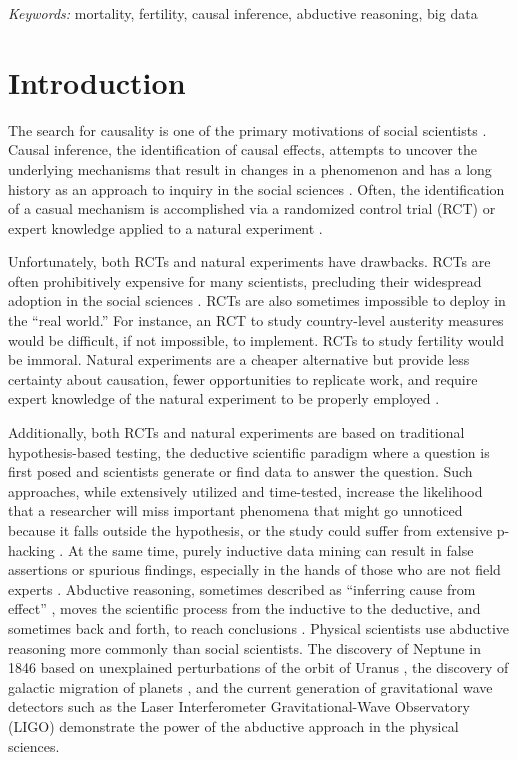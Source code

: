 \documentclass[12pt]{article}
\begin{document}
\noindent%
{\it Keywords:} mortality, fertility, causal inference, abductive
reasoning, big data
\vfill

\newpage
{} %

\newpage

\hypertarget{introduction}{%
\section{Introduction}\label{introduction}}

The search for causality is one of the primary motivations of social
scientists \citep{smith2011commentary, pearl2009causal}. Causal
inference, the identification of causal effects, attempts to uncover the
underlying mechanisms that result in changes in a phenomenon and has a
long history as an approach to inquiry in the social sciences
\citep{grimmer2015ppsp}. Often, the identification of a casual mechanism
is accomplished via a randomized control trial (RCT) or expert knowledge
applied to a natural experiment \citep{salganik2019bit}.

Unfortunately, both RCTs and natural experiments have drawbacks. RCTs
are often prohibitively expensive for many scientists, precluding their
widespread adoption in the social sciences \citep{west2008ajph}. RCTs
are also sometimes impossible to deploy in the ``real world.'' For
instance, an RCT to study country-level austerity measures would be
difficult, if not impossible, to implement. RCTs to study fertility
would be immoral. Natural experiments are a cheaper alternative but
provide less certainty about causation, fewer opportunities to replicate
work, and require expert knowledge of the natural experiment to be
properly employed \citep{pearl2018book}.

Additionally, both RCTs and natural experiments are based on traditional
hypothesis-based testing, the deductive scientific paradigm where a
question is first posed and scientists generate or find data to answer
the question. Such approaches, while extensively utilized and
time-tested, increase the likelihood that a researcher will miss
important phenomena that might go unnoticed because it falls outside the
hypothesis, or the study could suffer from extensive p-hacking
\citep{head2015extent, nuzzo2014scientific, ruggles2014big}. At the same
time, purely inductive data mining can result in false assertions or
spurious findings, especially in the hands of those who are not field
experts \citep{yanai_hypothesis_2020}. Abductive reasoning, sometimes
described as ``inferring cause from effect'' \citep{Crowder2017}, moves
the scientific process from the inductive to the deductive, and
sometimes back and forth, to reach conclusions \citep{bryant2014realm}.
Physical scientists use abductive reasoning more commonly than social
scientists. The discovery of Neptune in 1846 based on unexplained
perturbations of the orbit of Uranus \citep{popper2005logic}, the
discovery of galactic migration of planets \citep{gomes2005n}, and the
current generation of gravitational wave detectors such as the Laser
Interferometer Gravitational-Wave Observatory (LIGO)
\citep{harry2010advanced} demonstrate the power of the abductive
approach in the physical sciences.
\end{document}

